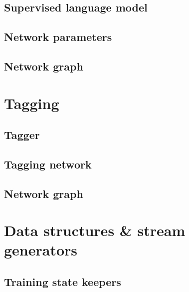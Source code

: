 \subsection{Supervised language model}
\label{sec:langmodel}

\subsection{Network parameters}
\label{sec:nnetworkparams}

\subsection{Network graph}
\label{sec:modelcost}


\section{Tagging}
\subsection{Tagger}
\label{sec:trainer}


\subsection{Tagging network}
\label{sec:langmodel}

\subsection{Network graph}
\label{sec:modelcost}


\section{Data structures \& stream generators}
\subsection{Training state keepers}
\label{sec:trainstate}

